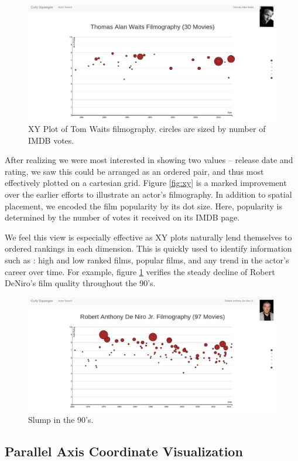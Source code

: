 \documentclass[12pt]{article}
\begin{document}
\begin{figure}
	\centering
	\includegraphics[width=.7\linewidth]{images/timelineC_crop_waits.png}
				  \caption{XY Plot of Tom Waits filmography.  circles are sized by number of  IMDB votes.}
\end{figure}\label{fig:xy}


After realizing we were most interested in showing two values -- release date and rating, we saw this could be arranged as an ordered pair, and thus most effectively plotted on a cartesian grid.  Figure \ref{fig:xy} is a marked improvement over the earlier efforts to illustrate an actor's filmography.  In addition to spatial placement, we encoded the film popularity by its dot size.  Here, popularity is determined by the number of votes it received on its IMDB page.

We feel this view is especially effective as XY plots naturally lend themselves to ordered rankings in each dimension.  This is quickly used to identify information such as : high and low ranked films, popular films, and any trend in the actor's career over time.  For example, figure \ref{fig:deniro} verifies the steady decline of  Robert DeNiro's film quality throughout the 90's.

\begin{figure}
	\centering
	\includegraphics[width=.7\linewidth]{images/Deniro_timeline.png}
				  \caption{Slump in the 90's.}\label{fig:deniro}
\end{figure}

\newpage 

\subsection{Parallel Axis Coordinate Visualization}
	
\end{document}
